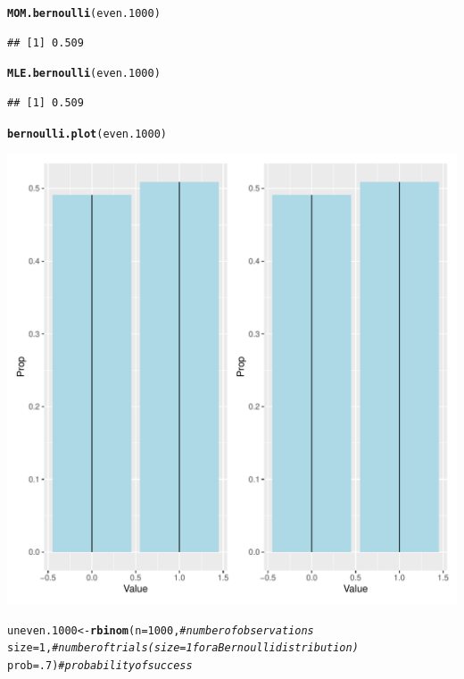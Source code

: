 \documentclass{article}\usepackage[]{graphicx}\usepackage[]{color}
\makeatletter
\def\maxwidth{ %
  \ifdim\Gin@nat@width>\linewidth
    \linewidth
  \else
    \Gin@nat@width
  \fi
}
\newcommand{\hlnum}[1]{\textcolor[rgb]{0.686,0.059,0.569}{#1}}%
\newcommand{\hlcom}[1]{\textcolor[rgb]{0.678,0.584,0.686}{\textit{#1}}}%
\newcommand{\hlstd}[1]{\textcolor[rgb]{0.345,0.345,0.345}{#1}}%
\newcommand{\hlkwb}[1]{\textcolor[rgb]{0.69,0.353,0.396}{#1}}%
\newcommand{\hlkwc}[1]{\textcolor[rgb]{0.333,0.667,0.333}{#1}}%
\newcommand{\hlkwd}[1]{\textcolor[rgb]{0.737,0.353,0.396}{\textbf{#1}}}%
\newenvironment{kframe}{%
 \def\at@end@of@kframe{}%
 \ifinner\ifhmode%
  \def\at@end@of@kframe{\end{minipage}}%
  \begin{minipage}{\columnwidth}%
 \fi\fi%
 \def\FrameCommand##1{\hskip\@totalleftmargin \hskip-\fboxsep
 \colorbox{shadecolor}{##1}\hskip-\fboxsep
     \hskip-\linewidth \hskip-\@totalleftmargin \hskip\columnwidth}%
 \MakeFramed {\advance\hsize-\width
   \@totalleftmargin\z@ \linewidth\hsize
   \@setminipage}}%
 {\par\unskip\endMakeFramed%
 \at@end@of@kframe}
\newenvironment{knitrout}{}{} %
\makeatother
\begin{document}
\begin{enumerate}
\begin{enumerate}
\begin{knitrout}
\begin{kframe}
\begin{alltt}
\hlkwd{MOM.bernoulli}\hlstd{(even.1000)}
\end{alltt}
\begin{verbatim}
## [1] 0.509
\end{verbatim}
\begin{alltt}
\hlkwd{MLE.bernoulli}\hlstd{(even.1000)}
\end{alltt}
\begin{verbatim}
## [1] 0.509
\end{verbatim}
\begin{alltt}
\hlkwd{bernoulli.plot}\hlstd{(even.1000)}
\end{alltt}
\end{kframe}
\includegraphics[width=\maxwidth]{figure/unnamed-chunk-8-1} 
\begin{kframe}\begin{alltt}
\hlstd{uneven.1000} \hlkwb{<-} \hlkwd{rbinom}\hlstd{(}\hlkwc{n}\hlstd{=}\hlnum{1000}\hlstd{,}        \hlcom{#number of observations}
                    \hlkwc{size}\hlstd{=}\hlnum{1}\hlstd{,}        \hlcom{#number of trials (size=1 for a Bernoulli distribution)}
                    \hlkwc{prob}\hlstd{=}\hlnum{.7}\hlstd{)}       \hlcom{#probability of success}


\end{alltt}
\end{kframe}
\end{knitrout}
\end{enumerate}
\end{enumerate}
\end{document}
